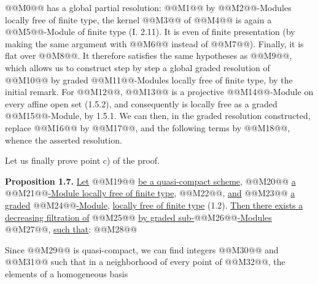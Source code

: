 @@M0@@ has a global partial resolution:
@@M1@@
by @@M2@@-Modules locally free of finite type, the kernel @@M3@@ of @@M4@@ is again a @@M5@@-Module of finite type (I. 2.11). It is even of finite presentation (by making the same argument with @@M6@@ instead of @@M7@@). Finally, it is flat over @@M8@@. It therefore satisfies the same hypotheses as @@M9@@, which allows us to construct step by step a global graded resolution of @@M10@@ by graded @@M11@@-Modules locally free of finite type, by the initial remark. For @@M12@@, @@M13@@ is a projective @@M14@@-Module on every affine open set (1.5.2), and consequently is locally free as a graded @@M15@@-Module, by 1.5.1. We can then, in the graded resolution constructed, replace @@M16@@ by @@M17@@, and the following terms by @@M18@@, whence the asserted resolution.

Let us finally prove point c) of the proof.

\textbf{Proposition 1.7.} \uline{Let} @@M19@@ \uline{be a quasi-compact scheme}, @@M20@@ \uline{a} @@M21@@\uline{-Module locally free of finite type}, @@M22@@, \uline{and} @@M23@@ \uline{a graded} @@M24@@\uline{-Module}, \uline{locally free of finite type} (1.2). \uline{Then there exists a decreasing filtration of} @@M25@@ \uline{by graded sub-}@@M26@@\uline{-Modules} @@M27@@, \uline{such that}:
@@M28@@

Since @@M29@@ is quasi-compact, we can find integers @@M30@@ and @@M31@@ such that in a neighborhood of every point of @@M32@@, the elements of a homogeneous basis

